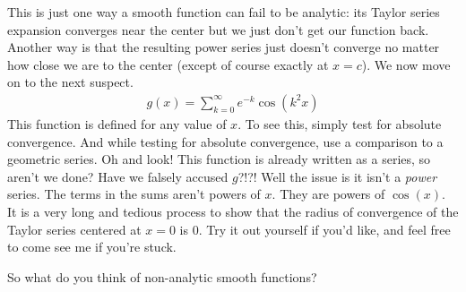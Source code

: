 \documentclass{ximera}
\begin{document}
\begin{exercise}
\begin{exercise}
\begin{exercise}
			This is just one way a smooth function can fail to be analytic: its Taylor series expansion converges near the center but we just don't get our function back. Another way is that the resulting power series just doesn't converge no matter how close we are to the center (except of course exactly at $x=c$). We now move on to the next suspect.
			\begin{align}
				g(x)=\sum_{k=0}^\infty e^{-k}\cos(k^2 x)
			\end{align}
			This function is defined for any value of $x$. To see this, simply test for absolute convergence. And while testing for absolute convergence, use a comparison to a geometric series. Oh and look! This function is already written as a series, so aren't we done? Have we falsely accused $g$?!?! Well the issue is it isn't a \emph{power} series. The terms in the sums aren't powers of $x$. They are powers of $\cos(x)$. It is a very long and tedious process to show that the radius of convergence of the Taylor series centered at $x=0$ is $0$. Try it out yourself if you'd like, and feel free to come see me if you're stuck.
			
			So what do you think of non-analytic smooth functions?
			\begin{multipleChoice}
			\end{multipleChoice}
		
		\end{exercise}
		
	\end{exercise}
	
\end{exercise}
\end{document}
